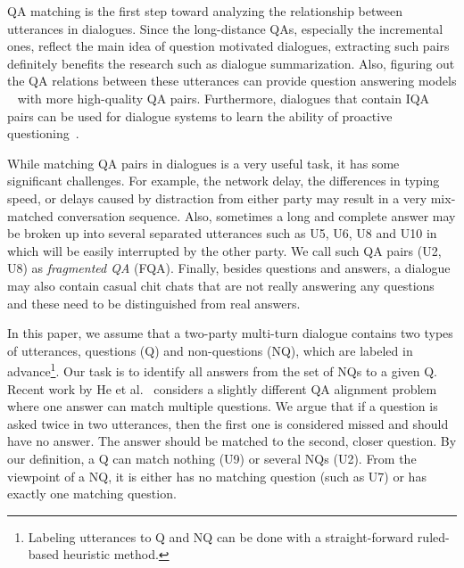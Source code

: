 QA matching is the first step toward analyzing the relationship between utterances in dialogues. Since the long-distance QAs, especially the incremental ones, reflect the main idea of question motivated dialogues, extracting such pairs definitely benefits the research such as dialogue summarization. Also, figuring out the QA relations between these utterances can provide question answering models ~\cite{ji2014information,vinyals2015neural,cui2017superagent} with more high-quality QA pairs. Furthermore, dialogues that contain IQA pairs can be used for dialogue systems to learn the ability of proactive questioning~\cite{yan2017building}.

While matching QA pairs in dialogues is a very useful task, it has some significant challenges. For example, the network delay, the differences in typing speed, or delays caused by distraction from either party may result in a very mix-matched conversation sequence. Also, sometimes a long and complete answer may be broken up into several separated utterances such as U5, U6, U8 and U10 in  which will be easily interrupted by the other party. We call such QA pairs (U2, U8) as {\em fragmented QA} (FQA). Finally, besides questions and answers, a dialogue may also contain casual chit chats that are not really answering any questions and these need to be distinguished from real answers. 

In this paper, we assume that a two-party multi-turn dialogue contains two types of utterances, questions (Q) and non-questions (NQ), which are labeled in advance\footnote{Labeling utterances to Q and NQ can be done with a straight-forward ruled-based heuristic method.}. Our task is to identify all answers from the set of NQs to a given Q. Recent work by He et al.~ considers a slightly different QA alignment problem where one answer can match multiple questions. We argue that if a question is asked twice in two utterances, then the first one is considered missed and should have no answer. The answer should be matched to the second, closer question. By our definition, a Q can match nothing (U9) or several NQs (U2). From the viewpoint of a NQ, it is either has no matching question (such as U7) or has exactly one matching question.
 
